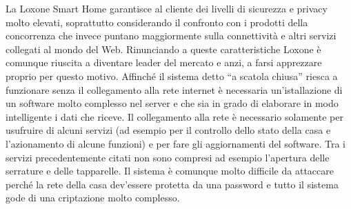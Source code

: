 La Loxone Smart Home garantisce al cliente dei livelli di sicurezza e privacy molto elevati, soprattutto considerando il confronto con i prodotti della concorrenza che invece puntano maggiormente sulla connettività e altri servizi collegati al mondo del Web. Rinunciando a queste caratteristiche Loxone è comunque riuscita a diventare leader del mercato e anzi, a farsi apprezzare proprio per questo motivo. Affinché il sistema detto “a scatola chiusa” riesca a funzionare senza il collegamento alla rete internet è necessaria un’istallazione di un software molto complesso nel server e che sia in grado di elaborare in modo intelligente i dati che riceve. Il collegamento alla rete è necessario solamente per usufruire di alcuni servizi (ad esempio per il controllo dello stato della casa e l’azionamento di alcune funzioni) e per fare gli aggiornamenti del software. Tra i servizi precedentemente citati non sono compresi ad esempio l’apertura delle serrature e delle tapparelle. Il sistema è comunque molto difficile da attaccare perché la rete della casa dev’essere protetta da una password e tutto il sistema gode di una criptazione molto complesso. 